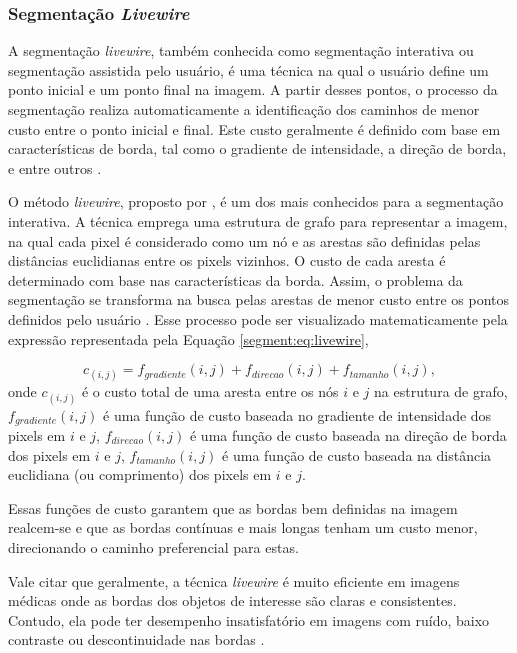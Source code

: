 \subsubsection{Segmentação \textit{Livewire}}
\label{segment:livewire}
A segmentação \textit{livewire}, também conhecida como segmentação interativa ou segmentação assistida pelo usuário, é uma técnica na qual o usuário define um ponto inicial e um ponto final na imagem. A partir desses pontos, o processo da segmentação realiza automaticamente a identificação dos caminhos de menor custo entre o ponto inicial e final. Este custo geralmente é definido com base em características de borda, tal como o gradiente de intensidade, a direção de borda, e entre outros \citep{Falcao1997Paradigmas3D-Live-Wire}.

O método \textit{livewire}, proposto por \cite{Barrett1997InteractiveExtraction}, é um dos mais conhecidos para a segmentação interativa. A técnica emprega uma estrutura de grafo para representar a imagem, na qual cada pixel é considerado como um nó e as arestas são definidas pelas distâncias euclidianas entre os pixels vizinhos. O custo de cada aresta é determinado com base nas características da borda. Assim, o problema da segmentação se transforma na busca pelas arestas de menor custo entre os pontos definidos pelo usuário \citep{Barrett1997InteractiveExtraction}. Esse processo pode ser visualizado matematicamente pela expressão representada pela Equação \ref{segment:eq:livewire},

\begin{equation}
    \label{segment:eq:livewire}
    c_{(i, j)} = f_{gradiente}(i, j) + f_{direcao}(i, j) + f_{tamanho}(i, j),
\end{equation}
onde $c_{(i, j)}$ é o custo total de uma aresta entre os nós $i$ e $j$ na estrutura de grafo, $f_{gradiente}(i, j)$ é uma função de custo baseada no gradiente de intensidade dos pixels em $i$ e $j$, $f_{direcao}(i, j)$ é uma função de custo baseada na direção de borda dos pixels em $i$ e $j$, $f_{tamanho}(i, j)$ é uma função de custo baseada na distância euclidiana (ou comprimento) dos pixels em $i$ e $j$.

Essas funções de custo garantem que as bordas bem definidas na imagem realcem-se e que as bordas contínuas e mais longas tenham um custo menor, direcionando o caminho preferencial para estas.

Vale citar que geralmente, a técnica \textit{livewire} é muito eficiente em imagens médicas onde as bordas dos objetos de interesse são claras e consistentes. Contudo, ela pode ter desempenho insatisfatório em imagens com ruído, baixo contraste ou descontinuidade nas bordas \citep{Falcao1997Paradigmas3D-Live-Wire}.

